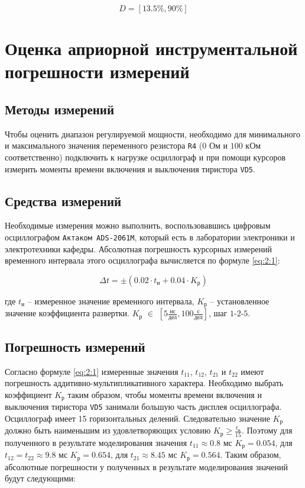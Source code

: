 \begin{displaymath}
	D = [13.5\% , 90\% ]
\end{displaymath}

\section{Оценка априорной инструментальной погрешности измерений}

\subsection{Методы измерений}

Чтобы оценить диапазон регулируемой мощности, необходимо для минимального и максимального значения переменного резистора \verb+R4+ ($0$ Ом и $100$ кОм соответственно) подключить к нагрузке осциллограф и при помощи курсоров измерить моменты времени включения и выключения тиристора \verb+VD5+.

\subsection{Средства измерений}

Необходимые измерения можно выполнить, воспользовавшись цифровым осциллографом \verb+Актаком ADS-2061M+, который есть в лаборатории электроники и электротехники кафедры. Абсолютная погрешность курсорных измерений временного интервала этого осциллографа вычисляется по формуле \ref{eq:2:1}:

\begin{equation}
\label{eq:2:1}
	\Delta t = \pm \left(0.02 \cdot t_{\text{и}} + 0.04 \cdot K_{\text{р}} \right)
\end{equation}

\noindent где $t_{\text{и}}$ -- измеренное значение временного интервала, $K_{\text{р}}$ -- установленное значение коэффициента развертки. $K_{\text{р}}$ $\in$ $\left[5 \frac{\text{нс}}{\text{дел}} , 100 \frac{\text{с}}{\text{дел}}\right]$, шаг $1$-$2$-$5$.

\subsection{Погрешность измерений}

Согласно формуле \ref{eq:2:1} измеренные значения $t_{11}$, $t_{12}$, $t_{21}$ и $t_{22}$ имеют погрешность аддитивно-мультипликативного характера. Необходимо выбрать коэффициент $K_{\text{р}}$ таким образом, чтобы моменты времени включения и выключения тиристора \verb+VD5+ занимали большую часть дисплея осциллографа. Осциллограф имеет 15 горизонтальных делений. Следовательно значение $K_{\text{р}}$ должно быть наименьшим из удовлетворяющих условию $K_{\text{р}} \geq \frac{t_{\text{и}}}{15}$. Поэтому для полученного в результате моделирования значения $t_{11} \approx 0.8$ мс $K_{\text{р}} = 0.054$, для $t_{12} = t_{22} \approx 9.8$ мс $K_{\text{р}} = 0.654$, для $t_{21} \approx 8.45$ мс $K_{\text{р}} = 0.564$.
Таким образом, абсолютные погрешности у полученных в результате моделирования значений будут следующими:

